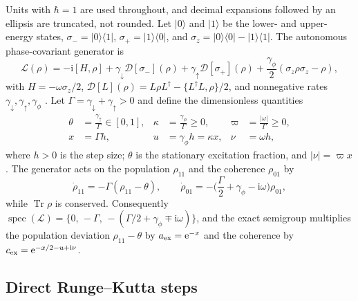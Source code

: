 \documentclass[pdflatex,sn-mathphys-num]{sn-jnl}
\newcommand{\Tr}{\operatorname{Tr}}
\newcommand{\spec}{\operatorname{spec}}
\newcommand{\e}{\mathrm{e}}
\newcommand{\ii}{\mathrm{i}}
\newcommand{\Lgen}{\mathcal L}
\theoremstyle{thmstyleone}
\theoremstyle{thmstylethree}
\theoremstyle{thmstyletwo}
\begin{document}
Units with $\hbar=1$ are used throughout, and decimal expansions followed by an ellipsis are truncated, not rounded. Let $|0\rangle$ and $|1\rangle$ be the lower- and upper-energy states, $\sigma_-=|0\rangle\langle1|$, $\sigma_+=|1\rangle\langle0|$, and $\sigma_z=|0\rangle\langle0|-|1\rangle\langle1|$. The autonomous phase-covariant generator is
\begin{equation}
 \Lgen(\rho)=-\ii[H,\rho]+\gamma_\downarrow\mathcal D[\sigma_-](\rho)+\gamma_\uparrow\mathcal D[\sigma_+](\rho)+\frac{\gamma_\phi}{2}(\sigma_z\rho\sigma_z-\rho),
 \label{eq:gksl}
\end{equation}
with $H=-\omega\sigma_z/2$, $\mathcal D[L](\rho)=L\rho L^\dagger-\{L^\dagger L,\rho\}/2$, and nonnegative rates $\gamma_\downarrow,\gamma_\uparrow,\gamma_\phi$ \cite{Filippov2020Phase,Siudzinska2023Geometry}. Let $\Gamma=\gamma_\downarrow+\gamma_\uparrow>0$ and define the dimensionless quantities
\begin{equation}
\begin{aligned}
 \theta&=\frac{\gamma_\uparrow}{\Gamma}\in[0,1],&
 \kappa&=\frac{\gamma_\phi}{\Gamma}\ge0,&
 \varpi&=\frac{|\omega|}{\Gamma}\ge0,\\
 x&=\Gamma h,& u&=\gamma_\phi h=\kappa x,& \nu&=\omega h,
\end{aligned}
 \label{eq:coordinates}
\end{equation}
where $h>0$ is the step size; $\theta$ is the stationary excitation fraction, and $|\nu|=\varpi x$. The generator acts on the population $\rho_{11}$ and the coherence $\rho_{01}$ by
\begin{equation}
 \dot\rho_{11}=-\Gamma(\rho_{11}-\theta),\qquad
 \dot\rho_{01}=-\Big(\frac\Gamma2+\gamma_\phi-\ii\omega\Big)\rho_{01},
 \label{eq:modes}
\end{equation}
while $\Tr\rho$ is conserved. Consequently $\spec(\Lgen)=\{0,\,-\Gamma,\,-(\Gamma/2+\gamma_\phi\mp\ii\omega)\}$, and the exact semigroup multiplies the population deviation $\rho_{11}-\theta$ by $a_{\rm ex}=\e^{-x}$ and the coherence by $c_{\rm ex}=\e^{-x/2-u+\ii\nu}$.

\subsection{Direct Runge--Kutta steps}\label{sec:rkstep}
\end{document}

